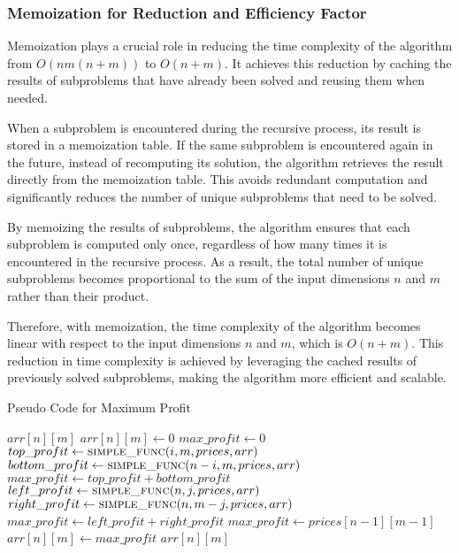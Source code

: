 \documentclass{article}
\begin{document}
\subsubsection{Memoization for  Reduction and Efficiency Factor }

Memoization plays a crucial role in reducing the time complexity of the algorithm from \(O(nm(n+m))\) to \(O(n + m)\). It achieves this reduction by caching the results of subproblems that have already been solved and reusing them when needed.

When a subproblem is encountered during the recursive process, its result is stored in a memoization table. If the same subproblem is encountered again in the future, instead of recomputing its solution, the algorithm retrieves the result directly from the memoization table. This avoids redundant computation and significantly reduces the number of unique subproblems that need to be solved.

By memoizing the results of subproblems, the algorithm ensures that each subproblem is computed only once, regardless of how many times it is encountered in the recursive process. As a result, the total number of unique subproblems becomes proportional to the sum of the input dimensions \(n\) and \(m\) rather than their product.

Therefore, with memoization, the time complexity of the algorithm becomes linear with respect to the input dimensions \(n\) and \(m\), which is \(O(n + m)\). This reduction in time complexity is achieved by leveraging the cached results of previously solved subproblems, making the algorithm more efficient and scalable.




\begin{algorithm}
\caption{Pseudo Code for Maximum Profit}
\begin{algorithmic}[1]
        \State \Return $arr[n][m]$
        \State $arr[n][m] \gets 0$
    \Else
        \State $max\_profit \gets 0$
            \State $top\_profit \gets \textsc{simple\_func}(i, m, prices, arr)$
            \State $bottom\_profit \gets \textsc{simple\_func}(n - i, m, prices, arr)$
                \State $max\_profit \gets top\_profit + bottom\_profit$
            \EndIf
        \EndFor
            \State $left\_profit \gets \textsc{simple\_func}(n, j, prices, arr)$
            \State $right\_profit \gets \textsc{simple\_func}(n, m - j, prices, arr)$
                \State $max\_profit \gets left\_profit + right\_profit$
            \EndIf
        \EndFor
            \State $max\_profit \gets prices[n - 1][m - 1]$
        \EndIf
        \State $arr[n][m] \gets max\_profit$
    \EndIf
    \State \Return $arr[n][m]$
\EndFunction
\end{algorithmic}
\end{algorithm}
\end{document}
